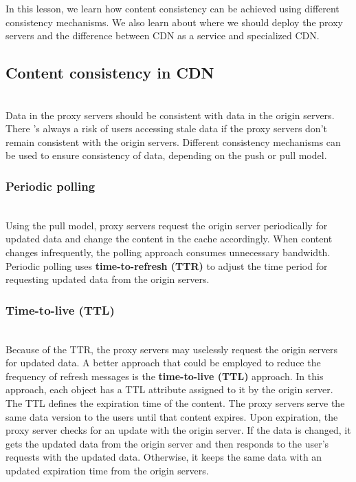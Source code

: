 

In this lesson, we learn how content consistency can be achieved using different consistency mechanisms. We also learn about where we should deploy the proxy servers and the difference between CDN as a service and specialized CDN.

\subsection{Content consistency in CDN}\label{XLAGLFpMJNmsVi2neKemE}
\\
Data in the proxy servers should be consistent with data in the origin servers. There 's always a risk of users accessing stale data if the proxy servers don't remain consistent with the origin servers. Different consistency mechanisms can be used to ensure consistency of data, depending on the push or pull model.

\subsubsection{Periodic polling}\label{tRLFLynzrpF_Ms8LZ4vt7}
\\
Using the pull model, proxy servers request the origin server periodically for updated data and change the content in the cache accordingly. When content changes infrequently, the polling approach consumes unnecessary bandwidth. Periodic polling uses \textbf{time-to-refresh (TTR)} to adjust the time period for requesting updated data from the origin servers.

\subsubsection{Time-to-live (TTL)}\label{IzZEDyxXQkHl2mv4d9inT}
\\
Because of the TTR, the proxy servers may uselessly request the origin servers for updated data. A better approach that could be employed to reduce the frequency of refresh messages is the \textbf{time-to-live (TTL)} approach. In this approach, each object has a TTL attribute assigned to it by the origin server. The TTL defines the expiration time of the content. The proxy servers serve the same data version to the users until that content expires. Upon expiration, the proxy server checks for an update with the origin server. If the data is changed, it gets the updated data from the origin server and then responds to the user's requests with the updated data. Otherwise, it keeps the same data with an updated expiration time from the origin servers.

